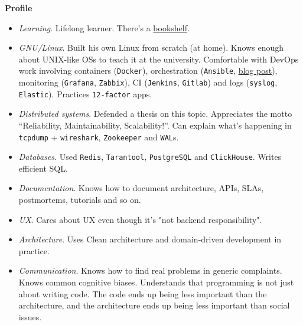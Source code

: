 \documentclass[final]{letter}
\def\code#1{\texttt{#1}}
\begin{document}
{\bf Profile}
\begin{itemize}
  \item \textit{Learning}. Lifelong learner. There's a \href{https://www.goodreads.com/review/list/43338630-sergey-machulskis?shelf=professional}{bookshelf}.
  \item \textit{GNU/Linux}. Built his own Linux from scratch (at home). Knows enough about UNIX-like OSs to teach it at the university.
  Comfortable with DevOps work involving containers (\code{Docker}),
   orchestration (\code{Ansible}, \href{https://neexee.github.io/posts-en/ansible-secrets/}{blog post}),
   monitoring (\code{Grafana}, \code{Zabbix}), CI (\code{Jenkins}, \code{Gitlab})
   and logs (\code{syslog}, \code{Elastic}). Practices \code{12-factor} apps.
  \item \textit{Distributed systems}. Defended a thesis on this topic. Appreciates the motto ``Reliability, Maintainability, Scalability!''.
    Can explain what's happening in \code{tcpdump} + \code{wireshark}, \code{Zookeeper} and \code{WAL}s.
  \item \textit{Databases}. Used \code{Redis}, \code{Tarantool}, \code{PostgreSQL} and \code{ClickHouse}. Writes efficient SQL.
  \item \textit{Documentation}. Knows how to document architecture, APIs, SLAs, postmortems, tutorials and so on.
  \item \textit{UX}. Cares about UX even though it's "not backend responsibility".
  \item \textit{Architecture}. Uses Clean architecture and domain-driven development in practice.
  \item \textit{Communication}. Knows how to find real problems in generic complaints. 
    Knows common cognitive biases.
    Understands that programming is not just about writing code. The code ends up being less important than the architecture, and the architecture ends up being less important than social issues. 
\end{itemize}
\end{document}
